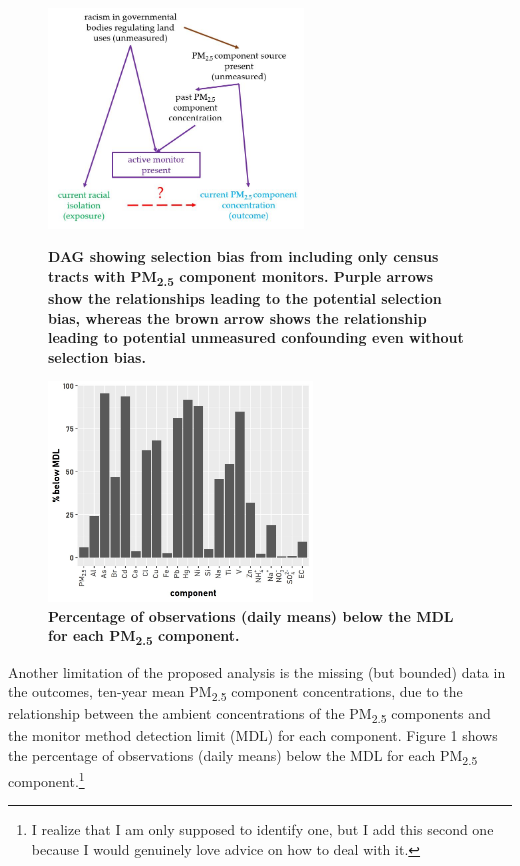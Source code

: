\documentclass{article}\usepackage[]{graphicx}\usepackage[]{color}
\begin{document}
\begin{enumerate}[label=\textbf{\arabic*.}]
  \begin{figure}
    \centering
    \begin{minipage}{0.45\textwidth}
        \centering
        \includegraphics[height=2.3in]{midtermdag.JPG}  %
        \caption{\textbf{DAG showing selection bias from including only census tracts with PM\textsubscript{2.5} component monitors. Purple arrows show the relationships leading to the potential selection bias, whereas the brown arrow shows the relationship leading to potential unmeasured confounding even without selection bias.}}
    \end{minipage}\hfill
    \begin{minipage}{0.45\textwidth}
        \centering
        \includegraphics[height=2.3in]{detectionlimit.jpg}  %
        \caption{\textbf{Percentage of observations (daily means) below the MDL for each PM\textsubscript{2.5} component.}}
    \end{minipage}
  \end{figure}

Another limitation of the proposed analysis is the missing (but bounded) data in the outcomes, ten-year mean PM\textsubscript{2.5} component concentrations, due to the relationship between the ambient concentrations of the PM\textsubscript{2.5} components and the monitor method detection limit (MDL) for each component. Figure 1 shows the percentage of observations (daily means) below the MDL for each PM\textsubscript{2.5} component.\footnote{I realize that I am only supposed to identify one, but I add this second one because I would genuinely love advice on how to deal with it.}

\end{enumerate}
      
\end{document}
